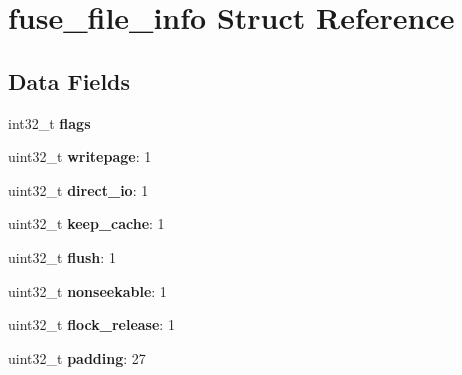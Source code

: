 \hypertarget{structfuse__file__info}{}\section{fuse\+\_\+file\+\_\+info Struct Reference}
\label{structfuse__file__info}
\subsection*{Data Fields}
\begin{DoxyCompactItemize}
\item 
int32\+\_\+t {\bfseries flags}\hypertarget{structfuse__file__info_afcff4109f1c8fb7ff51f18500496271d}{}\label{structfuse__file__info_afcff4109f1c8fb7ff51f18500496271d}

\item 
uint32\+\_\+t {\bfseries writepage}\+: 1\hypertarget{structfuse__file__info_a4f62e390e9355511a3b7729dd874d31b}{}\label{structfuse__file__info_a4f62e390e9355511a3b7729dd874d31b}

\item 
uint32\+\_\+t {\bfseries direct\+\_\+io}\+: 1\hypertarget{structfuse__file__info_acb9a658f1db6363dfaaa01631790a617}{}\label{structfuse__file__info_acb9a658f1db6363dfaaa01631790a617}

\item 
uint32\+\_\+t {\bfseries keep\+\_\+cache}\+: 1\hypertarget{structfuse__file__info_ad99bf1d615c8962ede1e0f62f2a848e3}{}\label{structfuse__file__info_ad99bf1d615c8962ede1e0f62f2a848e3}

\item 
uint32\+\_\+t {\bfseries flush}\+: 1\hypertarget{structfuse__file__info_ab3249f61a3bbdd1460846dd25b452be5}{}\label{structfuse__file__info_ab3249f61a3bbdd1460846dd25b452be5}

\item 
uint32\+\_\+t {\bfseries nonseekable}\+: 1\hypertarget{structfuse__file__info_a51f59646518a899cad414d4e816aae29}{}\label{structfuse__file__info_a51f59646518a899cad414d4e816aae29}

\item 
uint32\+\_\+t {\bfseries flock\+\_\+release}\+: 1\hypertarget{structfuse__file__info_a7c62db0b741eab0aa34c5d64039f5636}{}\label{structfuse__file__info_a7c62db0b741eab0aa34c5d64039f5636}

\item 
uint32\+\_\+t {\bfseries padding}\+: 27\hypertarget{structfuse__file__info_a757e1e13e178d6570060f18c669c2bcf}{}\label{structfuse__file__info_a757e1e13e178d6570060f18c669c2bcf}


\end{DoxyCompactItemize}
